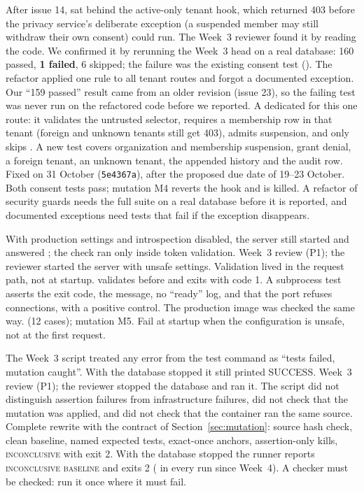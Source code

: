{After issue 14,  sat behind the active-only tenant hook, which returned 403 before the privacy service's deliberate exception (a suspended member may still withdraw their own consent) could run.}
{The Week~3 reviewer found it by reading the code. We confirmed it by rerunning the Week~3 head on a real database: 160 passed, \textbf{1 failed}, 6 skipped; the failure was the existing consent test ().}
{The refactor applied one rule to all tenant routes and forgot a documented exception. Our ``159 passed'' result came from an older revision (issue 23), so the failing test was never run on the refactored code before we reported.}
{A dedicated  for this one route: it validates the untrusted selector, requires a membership row in that tenant (foreign and unknown tenants still get 403), admits suspension, and only  skips . A new test covers organization and membership suspension, grant denial, a foreign tenant, an unknown tenant, the appended history and the audit row. Fixed on 31 October (\texttt{5e4367a}), after the proposed due date of 19--23 October.}
{Both consent tests pass; mutation M4 reverts the hook and is killed.}
{A refactor of security guards needs the full suite on a real database before it is reported, and documented exceptions need tests that fail if the exception disappears.}

{With production settings and introspection disabled, the server still started and answered ; the check ran only inside token validation.}
{Week~3 review (P1); the reviewer started the server with unsafe settings.}
{Validation lived in the request path, not at startup.}
{ validates before  and exits with code 1. A subprocess test asserts the exit code, the message, no ``ready'' log, and that the port refuses connections, with a positive control. The production image was checked the same way.}
{ (12 cases); mutation M5.}
{Fail at startup when the configuration is unsafe, not at the first request.}

{The Week~3 script treated any error from the test command as ``tests failed, mutation caught''. With the database stopped it still printed SUCCESS.}
{Week~3 review (P1); the reviewer stopped the database and ran it.}
{The script did not distinguish assertion failures from infrastructure failures, did not check that the mutation was applied, and did not check that the container ran the same source.}
{Complete rewrite with the contract of Section~\ref{sec:mutation}: source hash check, clean baseline, named expected tests, exact-once anchors, assertion-only kills, \textsc{inconclusive} with exit 2.}
{With the database stopped the runner reports \textsc{inconclusive baseline} and exits 2 ( in every run since Week~4).}
{A checker must be checked: run it once where it must fail.}

